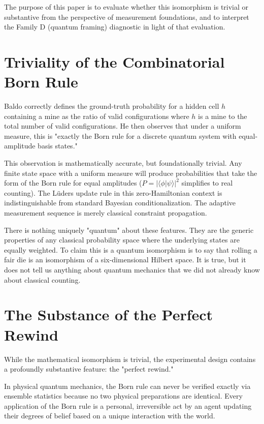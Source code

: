\documentclass[12pt,a4paper]{article}
\begin{document}
The purpose of this paper is to evaluate whether this isomorphism is trivial or substantive from the perspective of measurement foundations, and to interpret the Family D (quantum framing) diagnostic in light of that evaluation.

\section{Triviality of the Combinatorial Born Rule}

Baldo correctly defines the ground-truth probability for a hidden cell $h$ containing a mine as the ratio of valid configurations where $h$ is a mine to the total number of valid configurations. He then observes that under a uniform measure, this is "exactly the Born rule for a discrete quantum system with equal-amplitude basis states."

This observation is mathematically accurate, but foundationally trivial. Any finite state space with a uniform measure will produce probabilities that take the form of the Born rule for equal amplitudes ($P = |\langle \phi | \psi \rangle|^2$ simplifies to real counting). The L\"uders update rule in this zero-Hamiltonian context is indistinguishable from standard Bayesian conditionalization. The adaptive measurement sequence is merely classical constraint propagation.

There is nothing uniquely "quantum" about these features. They are the generic properties of any classical probability space where the underlying states are equally weighted. To claim this is a quantum isomorphism is to say that rolling a fair die is an isomorphism of a six-dimensional Hilbert space. It is true, but it does not tell us anything about quantum mechanics that we did not already know about classical counting.

\section{The Substance of the Perfect Rewind}

While the mathematical isomorphism is trivial, the experimental design contains a profoundly substantive feature: the "perfect rewind."

In physical quantum mechanics, the Born rule can never be verified exactly via ensemble statistics because no two physical preparations are identical. Every application of the Born rule is a personal, irreversible act by an agent updating their degrees of belief based on a unique interaction with the world.
\end{document}
